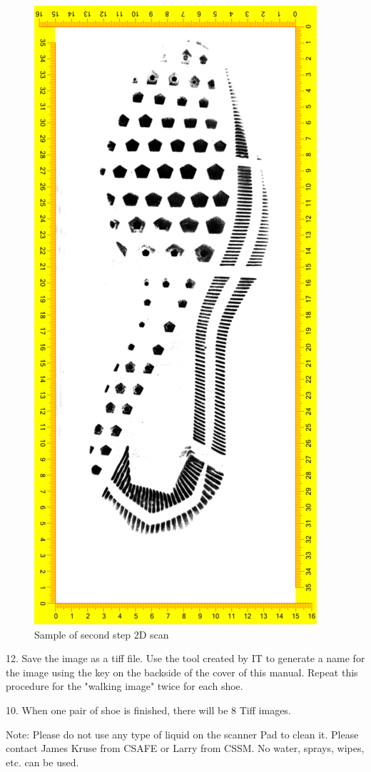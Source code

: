 \begin{figure}[!htp]
\centering
\includegraphics[scale=.9]{2D_2}
\caption{Sample of second step 2D scan}
\label{Image 8}
\end{figure}

\newpage

12. Save the image as a tiff file. Use the tool created by IT to generate a name for the image using the key on the backside of the cover of this manual. Repeat this procedure for the "walking image" twice for each shoe. 

10. When one pair of shoe is finished, there will be 8 Tiff images. 

Note: Please do not use any type of liquid on the scanner Pad to clean it. Please contact James Kruse from CSAFE or Larry from CSSM. No water, sprays, wipes, etc. can be used. 



